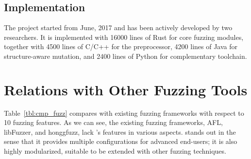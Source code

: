 %
%
%
 

\subsection{Implementation}\label{sec:fot-impl}

The {\FOT} project started from June, 2017 and has been actively developed by two researchers. It is implemented with 16000 lines of Rust for core fuzzing modules, together with 4500 lines of C/C++ for the preprocessor, 4200 lines of Java for structure-aware mutation, and 2400 lines of Python for complementary toolchain.
  

\section{Relations with Other Fuzzing Tools}





Table~\ref{tbl:cmp_fuzz} compares {\FOT} with existing fuzzing frameworks with respect to 10 fuzzing features. As we can see, the existing fuzzing frameworks, AFL, libFuzzer, and honggfuzz, lack \FOT's features in various aspects. {\FOT} stands out in the sense that it provides multiple configurations for advanced end-users; it is also highly modularized, suitable to be extended with other fuzzing techniques.


